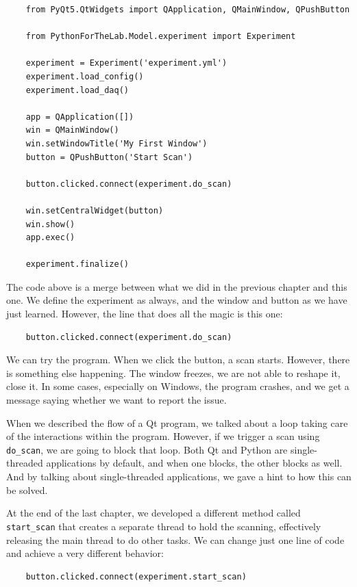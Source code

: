 \begin{verbatim}
    from PyQt5.QtWidgets import QApplication, QMainWindow, QPushButton

    from PythonForTheLab.Model.experiment import Experiment

    experiment = Experiment('experiment.yml')
    experiment.load_config()
    experiment.load_daq()

    app = QApplication([])
    win = QMainWindow()
    win.setWindowTitle('My First Window')
    button = QPushButton('Start Scan')

    button.clicked.connect(experiment.do_scan)

    win.setCentralWidget(button)
    win.show()
    app.exec()

    experiment.finalize()
\end{verbatim}

The code above is a merge between what we did in the previous chapter and this one. We define the experiment as always, and the window and button as we have just learned. However, the line that does all the magic is this one:

\begin{verbatim}
    button.clicked.connect(experiment.do_scan)
\end{verbatim}

We can try the program. When we click the button, a scan starts. However, there is something else happening. The window freezes, we are not able to reshape it, close it. In some cases, especially on Windows, the program crashes, and we get a message saying whether we want to report the issue.


When we described the flow of a Qt program, we talked about a loop taking care of the interactions within the program. However, if we trigger a scan using \texttt{do\_scan}, we are going to block that loop. Both Qt and Python are single-threaded applications by default, and when one blocks, the other blocks as well. And by talking about single-threaded applications, we gave a hint to how this can be solved.

At the end of the last chapter, we developed a different method called \texttt{start\_scan} that creates a separate thread to hold the scanning, effectively releasing the main thread to do other tasks. We can change just one line of code and achieve a very different behavior:

\begin{verbatim}
    button.clicked.connect(experiment.start_scan)
\end{verbatim}

